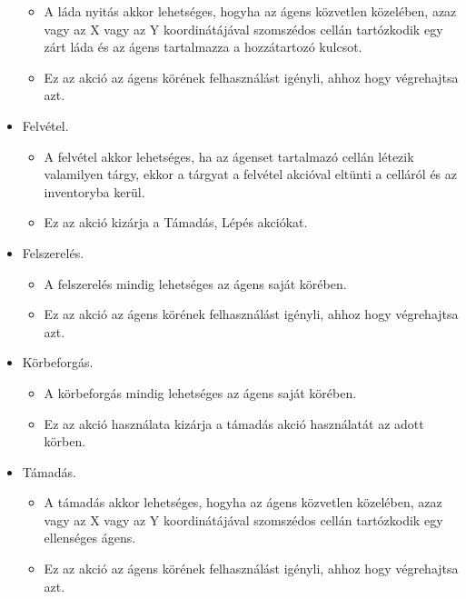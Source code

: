\begin{itemize}
    \begin{itemize}
        \item A láda nyitás akkor lehetséges, hogyha az ágens közvetlen közelében, azaz vagy az X vagy az Y koordinátájával szomszédos cellán tartózkodik egy zárt láda és az ágens tartalmazza a hozzátartozó kulcsot.
        \item Ez az akció az ágens körének felhasználást igényli, ahhoz hogy végrehajtsa azt.
    \end{itemize}

    \item Felvétel. 
    
    \begin{itemize}
        \item A felvétel akkor lehetséges, ha az ágenset tartalmazó cellán létezik valamilyen tárgy, ekkor a tárgyat a felvétel akcióval eltünti a celláról és az inventoryba kerül.
        \item Ez az akció kizárja a Támadás, Lépés akciókat.
    \end{itemize}

    \item Felszerelés. 
    
    \begin{itemize}
        \item A felszerelés mindig lehetséges az ágens saját körében.
        \item Ez az akció az ágens körének felhasználást igényli, ahhoz hogy végrehajtsa azt.
    \end{itemize}

    \item Körbeforgás. 
    
    \begin{itemize}
        \item A körbeforgás mindig lehetséges az ágens saját körében.
        \item Ez az akció használata kizárja a támadás akció használatát az adott körben.
    \end{itemize}

    \item Támadás. 
    
    \begin{itemize}
        \item A támadás akkor lehetséges, hogyha az ágens közvetlen közelében, azaz vagy az X vagy az Y koordinátájával szomszédos cellán tartózkodik egy ellenséges ágens.
        \item Ez az akció az ágens körének felhasználást igényli, ahhoz hogy végrehajtsa azt.
    \end{itemize}

\end{itemize}

